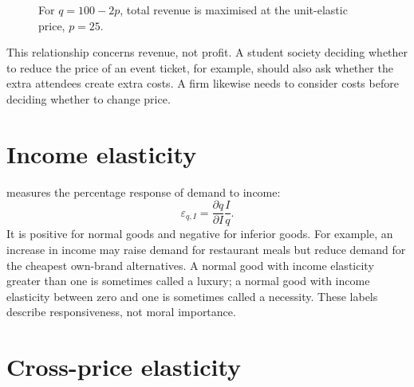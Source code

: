 \begin{figure}[!ht]
  \centering
  \caption{For $q=100-2p$, total revenue is maximised at the unit-elastic price, $p=25$.}
  \label{fig:elasticity-total-revenue}
\end{figure}

This relationship concerns revenue, not profit. A student society deciding
whether to reduce the price of an event ticket, for example, should also ask
whether the extra attendees create extra costs. A firm likewise needs to
consider costs before deciding whether to change price.

\section{Income elasticity}

 measures the percentage response of demand to income:
\[
\varepsilon_{q,I}=\frac{\partial q}{\partial I}\frac{I}{q}.
\]
It is positive for normal goods and negative for inferior goods. For example,
an increase in income may raise demand for restaurant meals but reduce demand
for the cheapest own-brand alternatives. A normal good with income elasticity
greater than one is sometimes called a luxury; a normal good with income
elasticity between zero and one is sometimes called a necessity. These labels
describe responsiveness, not moral importance.

\section{Cross-price elasticity}

